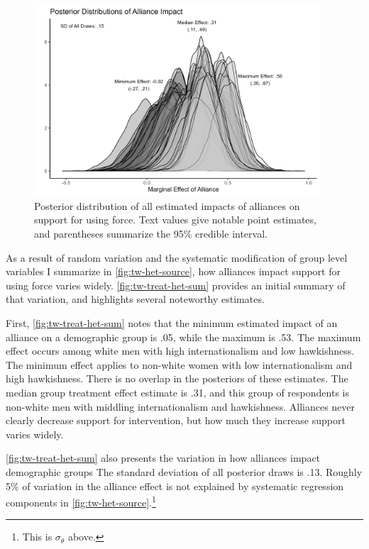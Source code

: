 \documentclass[12pt]{article}
\begin{document}
\begin{figure}[htpb]
	\centering
		\includegraphics[width=0.95\textwidth]{../figures/tw-treat-het-sum.png}
	\caption{Posterior distribution of all estimated impacts of alliances on support for using force. Text values give notable point estimates, and parentheses summarize the 95\% credible interval.}
	\label{fig:tw-treat-het-sum}
\end{figure}


As a result of random variation and the systematic modification of group level variables I summarize in \autoref{fig:tw-het-source}, how alliances impact support for using force varies widely. 
\autoref{fig:tw-treat-het-sum} provides an initial summary of that variation, and highlights several noteworthy estimates. 


First, \autoref{fig:tw-treat-het-sum} notes that the minimum estimated impact of an alliance on a demographic group is .05, while the maximum is .53. 
The maximum effect occurs among white men with high internationalism and low hawkishness.
The minimum effect applies to non-white women with low internationalism and high hawkishness. 
There is no overlap in the posteriors of these estimates. 
The median group treatment effect estimate is .31, and this group of respondents is non-white men with middling internationalism and hawkishness. 
Alliances never clearly decrease support for intervention, but how much they increase support varies widely. 


\autoref{fig:tw-treat-het-sum} also presents the variation in how alliances impact demographic groups 
The standard deviation of all posterior draws is .13. 
Roughly 5\% of variation in the alliance effect is not explained by systematic regression components in \autoref{fig:tw-het-source}.\footnote{This is $\sigma_\theta$ above.}
\end{document}
